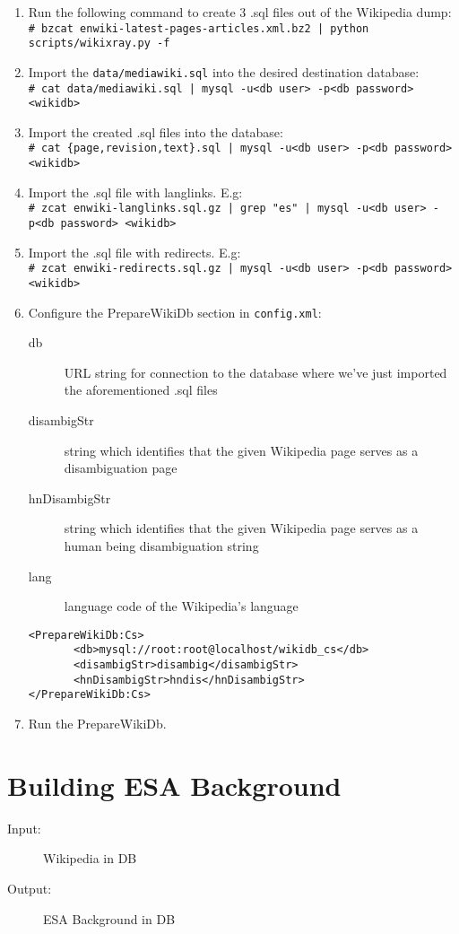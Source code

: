 \documentclass{article}
\begin{document}
\begin{enumerate}
\item Run the following command to create 3 .sql files out of the Wikipedia dump: \\ \texttt{\#  bzcat enwiki-latest-pages-articles.xml.bz2 | python scripts/wikixray.py -f }
\item Import the \texttt{data/mediawiki.sql} into the desired destination database: \\
\texttt{\# cat data/mediawiki.sql | mysql -u<db user> -p<db password> <wikidb>}
\item Import the created .sql files into the database: \\
\texttt{\# cat \{page,revision,text\}.sql | mysql -u<db user> -p<db password> <wikidb>}
\item Import the .sql file with langlinks. E.g: \\
\texttt{\# zcat enwiki-langlinks.sql.gz | grep "es" | mysql -u<db user> -p<db password> <wikidb>}
\item Import the .sql file with redirects. E.g: \\
\texttt{\# zcat enwiki-redirects.sql.gz | mysql -u<db user> -p<db password> <wikidb>}
\item Configure the PrepareWikiDb section in \verb|config.xml|:
  \begin{description}
  \item[db] URL string for connection to the database where we've just imported the aforementioned .sql files
  \item[disambigStr] string which identifies that the given Wikipedia page serves as a disambiguation page
  \item[hnDisambigStr] string which identifies that the given Wikipedia page serves as a human being disambiguation string
  \item[lang] language code of the Wikipedia's language
  \end{description}
\begin{verbatim}
<PrepareWikiDb:Cs>
       <db>mysql://root:root@localhost/wikidb_cs</db>
       <disambigStr>disambig</disambigStr>
       <hnDisambigStr>hndis</hnDisambigStr>
</PrepareWikiDb:Cs>
\end{verbatim}
\item Run the PrepareWikiDb.
\end{enumerate}


\section*{Building ESA Background}
\begin{description}
  \item[Input:] Wikipedia in DB
  \item[Output:] ESA Background in DB
\end{description}
\end{document}

